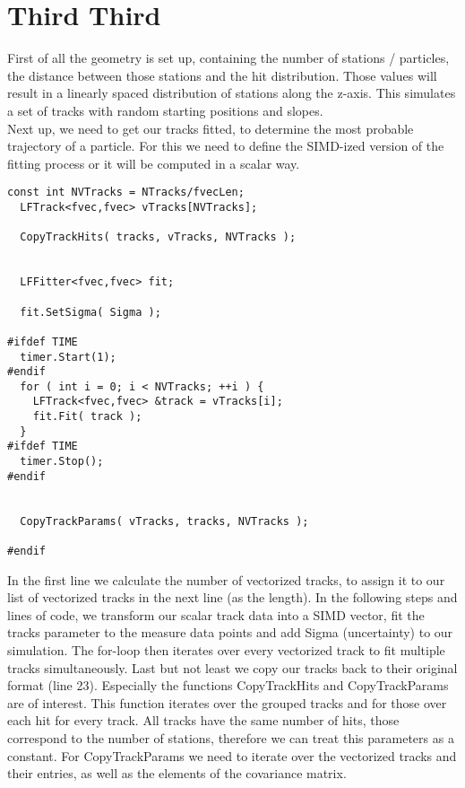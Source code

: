 \documentclass{article}
\begin{document}
\section*{Third Third}
First of all the geometry is set up, containing the number of stations / particles, the distance between those stations and the hit distribution.
Those values will result in a linearly spaced distribution of stations along the z-axis.
This simulates a set of tracks with random starting positions and slopes. \\

\noindent Next up, we need to get our tracks fitted, to determine the most probable
trajectory of a particle. For this we need to define the SIMD-ized version of the fitting process or
it will be computed in a scalar way.



\begin{lstlisting}[caption=KFLineFitter.cpp]
  const int NVTracks = NTracks/fvecLen;
  LFTrack<fvec,fvec> vTracks[NVTracks];
  
  CopyTrackHits( tracks, vTracks, NVTracks );
  
    
  LFFitter<fvec,fvec> fit;

  fit.SetSigma( Sigma );
  
#ifdef TIME
  timer.Start(1);
#endif
  for ( int i = 0; i < NVTracks; ++i ) {
    LFTrack<fvec,fvec> &track = vTracks[i];
    fit.Fit( track );
  }
#ifdef TIME
  timer.Stop();
#endif
  
    
  CopyTrackParams( vTracks, tracks, NVTracks );
  
#endif
\end{lstlisting}

\noindent In the first line we calculate the number of vectorized tracks, to assign it to our
list of vectorized tracks in the next line (as the length). In the following steps and lines of code,
we transform our scalar track data into a SIMD vector, fit the tracks parameter to the measure data points
and add Sigma (uncertainty) to our simulation.
The for-loop then iterates over every vectorized track to fit multiple tracks simultaneously.
Last but not least we copy our tracks back to their original format (line 23).
Especially the functions CopyTrackHits and CopyTrackParams are of interest.
This function iterates over the grouped tracks and for those over each hit for every track.
All tracks have the same number of hits, those correspond to the number of stations, therefore
we can treat this parameters as a constant.
For CopyTrackParams we need to iterate over the vectorized tracks and their entries, as well as the
elements of the covariance matrix. \\
\end{document}
